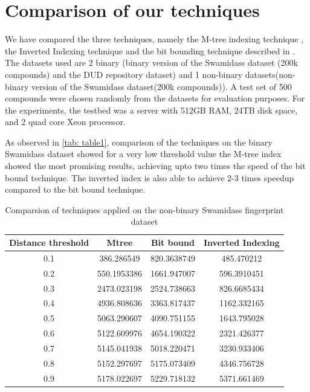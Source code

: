 \section{Comparison of our techniques}

We have compared the three techniques, namely the M-tree indexing technique , the Inverted Indexing technique and the bit bounding technique described in \citet*{swamidass2007bounds}. The datasets used are 2 binary (binary version of the Swamidass dataset (200k compounds) and the DUD repository dataset) and 1 non-binary datasets(non-binary version of the Swamidass dataset(200k compounds)). A test set of 500 compounds were chosen randomly from the datasets for evaluation purposes. For the experiments, the testbed was a server with 512GB RAM, 24TB disk space, and 2 quad core Xeon processor. 

As observed in \autoref{tab: table1}, comparison of the techniques on the binary Swamidass dataset showed for a very low threshold value the M-tree index showed the most promising results, achieving upto two times the speed of the bit bound technique. The inverted index is also able to achieve 2-3 times speedup compared to the bit bound technique. \\



\begin{table}[ht]
\centering
\caption{Comparsion of techniques applied on the non-binary Swamidass fingerprint dataset}
\label{tab: table1}
\begin{tabular}{|c|c|c|c|}
\hline 
Distance threshold & Mtree	& Bit bound	& 	Inverted Indexing \\
\hline
0.1	& 	386.286549	& 820.3638749	&	485.470212\\
0.2	& 	550.1953386	& 1661.947007	&	596.3910451\\
0.3	& 	2473.023198	& 2524.738663	&	826.6685434\\
0.4	& 	4936.808636	& 3363.817437	&	1162.332165\\
0.5	& 	5063.290607	& 4090.751155	&	1643.795028\\
0.6	& 	5122.609976	& 4654.190322	&	2321.426377\\
0.7	& 	5145.041938	& 5018.220471	&	3230.933406\\
0.8	& 	5152.297697	& 5175.073409	&	4346.756728\\
0.9	& 	5178.022697	& 5229.718132	&	5371.661469\\
\hline 
\end{tabular} 
\end{table}

